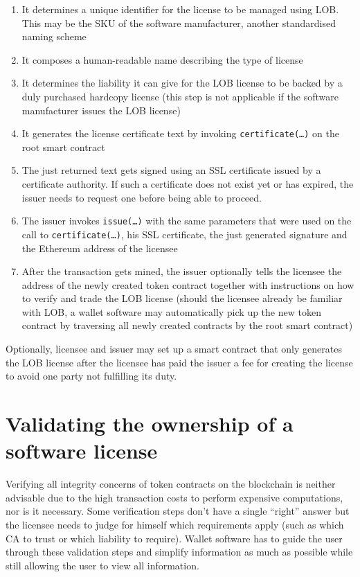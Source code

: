 \documentclass[a4paper]{article}
\begin{document}
\begin{enumerate}
  \item It determines a unique identifier for the license to be managed using LOB. This may be the SKU of the software manufacturer, another standardised naming scheme
  \item It composes a human-readable name describing the type of license
  \item It determines the liability it can give for the LOB license to be backed by a duly purchased hardcopy license (this step is not applicable if the software manufacturer issues the LOB license)
  \item It generates the license certificate text by invoking \texttt{certificate(…)} on the root smart contract
  \item The just returned text gets signed using an SSL certificate issued by a certificate authority. If such a certificate does not exist yet or has expired, the issuer needs to request one before being able to proceed.
  \item The issuer invokes \texttt{issue(…)} with the same parameters that were used on the call to \texttt{certificate(…)}, his SSL certificate, the just generated signature and the Ethereum address of the licensee
  \item After the transaction gets mined, the issuer optionally tells the licensee the address of the newly created token contract together with instructions on how to verify and trade the LOB license (should the licensee already be familiar with LOB, a wallet software may automatically pick up the new token contract by traversing all newly created contracts by the root smart contract)
\end{enumerate}

Optionally, licensee and issuer may set up a smart contract that only generates the LOB license after the licensee has paid the issuer a fee for creating the license to avoid one party not fulfilling its duty.

\section{Validating the ownership of a software license}
\label{ch:licenseValidation}

Verifying all integrity concerns of token contracts on the blockchain is neither advisable due to the high transaction costs to perform expensive computations, nor is it necessary. Some verification steps don't have a single “right” answer but the licensee needs to judge for himself which requirements apply (such as which CA to trust or which liability to require). Wallet software has to guide the user through these validation steps and simplify information as much as possible while still allowing the user to view all information.
\end{document}
